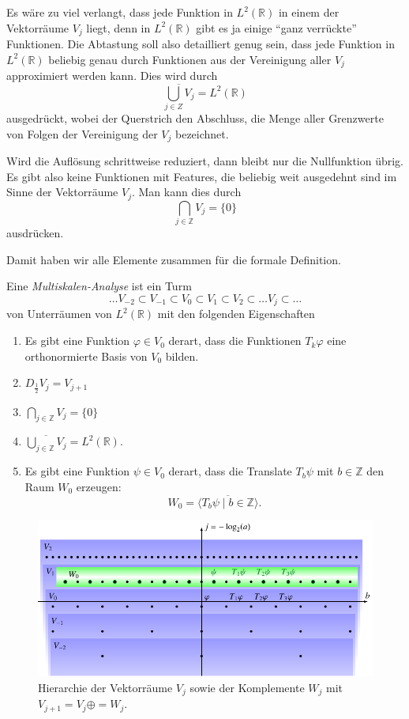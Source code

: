 Es wäre zu viel verlangt, dass jede Funktion in $L^2(\mathbb R)$ in
einem der Vektorräume $V_j$ liegt, denn in $L^2(\mathbb R)$ gibt
es ja einige ``ganz verrückte'' Funktionen.
Die Abtastung soll also detailliert genug sein, dass jede 
Funktion in $L^2(\mathbb R)$ beliebig genau durch Funktionen aus
der Vereinigung aller $V_j$ approximiert werden kann.
Dies wird durch
\[
\overline{\bigcup_{j\in Z} V_j} = L^2(\mathbb R)
\]
ausgedrückt, wobei der Querstrich den Abschluss, die Menge aller Grenzwerte
von Folgen der Vereinigung der $V_j$ bezeichnet.

Wird die Auflösung schrittweise reduziert, dann bleibt nur die Nullfunktion
übrig.
Es gibt also keine Funktionen mit Features, die beliebig weit ausgedehnt
sind im Sinne der Vektorräume $V_j$.
Man kann dies durch
\[
\bigcap_{j\in\mathbb Z} V_j = \{0\}
\]
ausdrücken.

Damit haben wir alle Elemente zusammen für die formale Definition.

\begin{definition}
Eine {\em Multiskalen-Analyse} ist ein Turm
\[
\dots
V_{-2}\subset
V_{-1}\subset
V_0\subset
V_1\subset
V_2\subset
\dots
V_j\subset
\dots
\]
von Unterräumen von $L^2(\mathbb R)$
mit den folgenden Eigenschaften
\begin{enumerate}
\item Es gibt eine Funktion $\varphi\in V_0$ derart, dass die Funktionen
$T_k\varphi$ eine orthonormierte Basis von $V_0$ bilden.
\item $D_{\frac12} V_j = V_{j+1}$
\item $\bigcap_{j\in\mathbb Z} V_j = \{0\}$
\item $\overline{\bigcup_{j\in\mathbb Z} V_j} = L^2(\mathbb R)$.
\item Es gibt eine Funktion $\psi\in V_0$ derart, dass
die Translate $T_b\psi$ mit $b\in\mathbb Z$ den Raum $W_0$ erzeugen:
\[
W_0 = \overline{\langle T_b\psi\;|\;b\in\mathbb Z\rangle}.
\]
\end{enumerate}
\end{definition}

\begin{figure}
\centering
\includegraphics{chapters/6-msa/images/msa.pdf}
\caption{Hierarchie der Vektorräume $V_j$ sowie der Komplemente $W_j$
mit
$V_{j+1} = V_j \oplus = W_j$.
\label{msa:vektorraumhierarchie}}
\end{figure}

